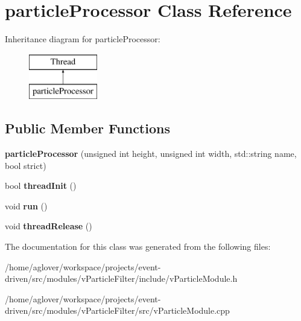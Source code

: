 \hypertarget{classparticleProcessor}{}\section{particle\+Processor Class Reference}
\label{classparticleProcessor}
Inheritance diagram for particle\+Processor\+:\begin{figure}[H]
\begin{center}
\leavevmode
\includegraphics[height=2.000000cm]{classparticleProcessor}
\end{center}
\end{figure}
\subsection*{Public Member Functions}
\begin{DoxyCompactItemize}
\item 
{\bfseries particle\+Processor} (unsigned int height, unsigned int width, std\+::string name, bool strict)\hypertarget{classparticleProcessor_af03a74f1518329726ae2e5e1ec92ee01}{}\label{classparticleProcessor_af03a74f1518329726ae2e5e1ec92ee01}

\item 
bool {\bfseries thread\+Init} ()\hypertarget{classparticleProcessor_aafa6595892c7e82b1c42b919dfe6f9f0}{}\label{classparticleProcessor_aafa6595892c7e82b1c42b919dfe6f9f0}

\item 
void {\bfseries run} ()\hypertarget{classparticleProcessor_aed880e77fafb61965d57565735939181}{}\label{classparticleProcessor_aed880e77fafb61965d57565735939181}

\item 
void {\bfseries thread\+Release} ()\hypertarget{classparticleProcessor_ae40c3b11945587c4c23547d7b817299a}{}\label{classparticleProcessor_ae40c3b11945587c4c23547d7b817299a}

\end{DoxyCompactItemize}


The documentation for this class was generated from the following files\+:\begin{DoxyCompactItemize}
\item 
/home/aglover/workspace/projects/event-\/driven/src/modules/v\+Particle\+Filter/include/v\+Particle\+Module.\+h\item 
/home/aglover/workspace/projects/event-\/driven/src/modules/v\+Particle\+Filter/src/v\+Particle\+Module.\+cpp\end{DoxyCompactItemize}
